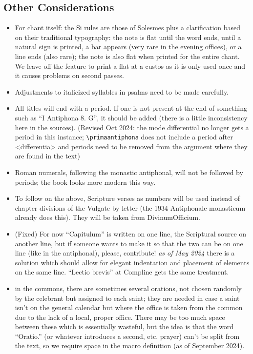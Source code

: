 \documentclass[11pt]{article}
\begin{document}
\subsection{Other Considerations}
\begin{itemize}
\item
For chant itself: the Si rules are those of Solesmes plus a clarification based on their traditional typography: the note is flat until the word ends, until a natural sign is printed, a bar appears (very rare in the evening offices), or a line ends (also rare); the note is also flat when printed for the entire chant. We leave off the feature to print a flat at a custos as it is only used once and it causes problems on second passes.
\item
Adjustments to italicized syllables in psalms need to be made carefully.
\item
All titles will end with a period. If one is not present at the end of something such as ``I Antiphona 8. G'', it should be added (there is a little inconsistency here in the sources). (Revised Oct 2024: the mode differential no longer gets a period in this instance; \verb|\primaantiphona| does not include a period after <differentia> and periods need to be removed from the argument where they are found in the text)
\item
Roman numerals, following the monastic antiphonal, will not be followed by periods; the book looks more modern this way.
\item
To follow on the above, Scripture verses as numbers will be used instead of chapter divisions of the Vulgate by letter (the 1934 Antiphonale monasticum already does this). They will be taken from DivinumOfficium.
\item
(Fixed) For now ``Capitulum'' is written on one line, the Scriptural source on another line, but if someone wants to make it so that the two can be on one line (like in the antiphonal), please, contribute! \emph{as of May 2024} there is a solution which should allow for elegant indentation and placement of elements on the same line. ``Lectio brevis'' at Compline gets the same treatment.
\item in the commons, there are sometimes several orations, not chosen randomly by the celebrant but assigned to each saint; they are needed in case a saint isn't on the general calendar but where the office is taken from the common due to the lack of a local, proper office. There may be too much space between these which is essentially wasteful, but the idea is that the word ``Oratio.'' (or whatever introduces a second, etc. prayer) can't be split from the text, so we require space in the macro definition (as of September 2024).

\end{itemize}
\end{document}
